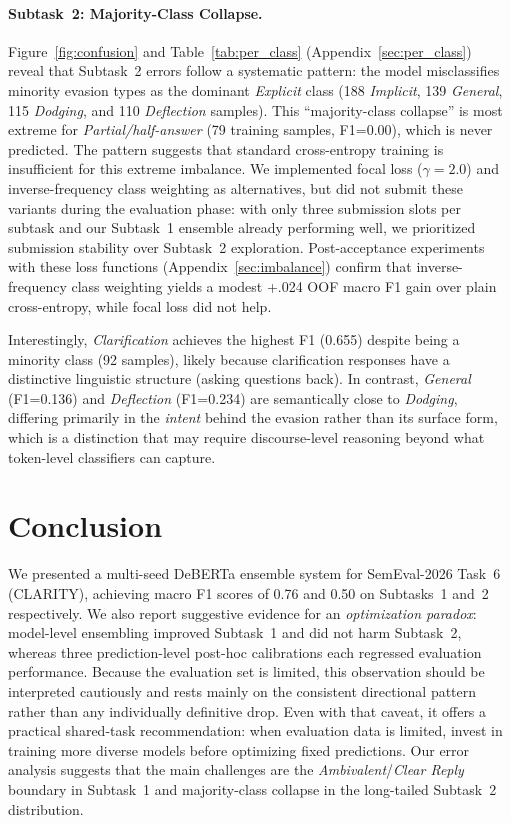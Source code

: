 \documentclass[11pt]{article}
\begin{document}
\paragraph{Subtask~2: Majority-Class Collapse.}

Figure~\ref{fig:confusion} and Table~\ref{tab:per_class} (Appendix~\ref{sec:per_class}) reveal that Subtask~2 errors follow a systematic pattern: the model misclassifies minority evasion types as the dominant \textit{Explicit} class (188 \textit{Implicit}, 139 \textit{General}, 115 \textit{Dodging}, and 110 \textit{Deflection} samples). This ``majority-class collapse'' is most extreme for \textit{Partial/half-answer} (79 training samples, F1=0.00), which is never predicted. The pattern suggests that standard cross-entropy training is insufficient for this extreme imbalance. We implemented focal loss \citep{lin2017focal} ($\gamma{=}2.0$) and inverse-frequency class weighting as alternatives, but did not submit these variants during the evaluation phase: with only three submission slots per subtask and our Subtask~1 ensemble already performing well, we prioritized submission stability over Subtask~2 exploration. Post-acceptance experiments with these loss functions (Appendix~\ref{sec:imbalance}) confirm that inverse-frequency class weighting yields a modest +.024 OOF macro F1 gain over plain cross-entropy, while focal loss did not help.

Interestingly, \textit{Clarification} achieves the highest F1 (0.655) despite being a minority class (92 samples), likely because clarification responses have a distinctive linguistic structure (asking questions back). In contrast, \textit{General} (F1=0.136) and \textit{Deflection} (F1=0.234) are semantically close to \textit{Dodging}, differing primarily in the \textit{intent} behind the evasion rather than its surface form, which is a distinction that may require discourse-level reasoning beyond what token-level classifiers can capture.

\section{Conclusion}

We presented a multi-seed DeBERTa ensemble system for SemEval-2026 Task~6 (CLARITY), achieving macro F1 scores of 0.76 and 0.50 on Subtasks~1 and~2 respectively. We also report suggestive evidence for an \emph{optimization paradox}: model-level ensembling improved Subtask~1 and did not harm Subtask~2, whereas three prediction-level post-hoc calibrations each regressed evaluation performance. Because the evaluation set is limited, this observation should be interpreted cautiously and rests mainly on the consistent directional pattern rather than any individually definitive drop. Even with that caveat, it offers a practical shared-task recommendation: when evaluation data is limited, invest in training more diverse models before optimizing fixed predictions. Our error analysis suggests that the main challenges are the \textit{Ambivalent}/\textit{Clear Reply} boundary in Subtask~1 and majority-class collapse in the long-tailed Subtask~2 distribution.
\end{document}

